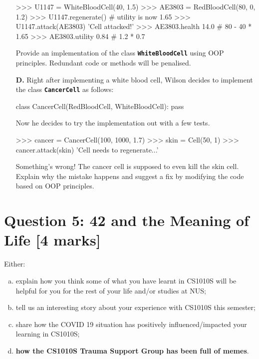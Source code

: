 \begin{enumerate}
\begin{python}
>>> U1147 = WhiteBloodCell(40, 1.5)
>>> AE3803 = RedBloodCell(80, 0, 1.2)
>>> U1147.regenerate()      # utility is now 1.65
>>> U1147.attack(AE3803)
'Cell attacked!'
>>> AE3803.health
14.0                        # 80 - 40 * 1.65
>>> AE3803.utility
0.84                        # 1.2 * 0.7
\end{python}
Provide an implementation of the class \colorbox{CornflowerBlue!20}{\texttt{\textbf{WhiteBloodCell}}} using OOP principles. Redundant code or methods will be 
penalised.
\begin{flushright}
    [6 marks]
\end{flushright}

\item[\textbf{D.}]
Right after implementing a white blood cell, Wilson decides to implement the class \colorbox{CornflowerBlue!20}{\texttt{\textbf{CancerCell}}} as follows:
\begin{python}
class CancerCell(RedBloodCell, WhiteBloodCell):
    pass
\end{python}
Now he decides to try the implementation out with a few tests.
\begin{python}
>>> cancer = CancerCell(100, 1000, 1.7)
>>> skin = Cell(50, 1)
>>> cancer.attack(skin)
'Cell needs to regenerate...'
\end{python}
Something's wrong! The cancer cell is supposed to even kill the skin cell. Explain why the mistake happens 
and suggest a fix by modifying the code based on OOP principles.
\begin{flushright}
    [5 marks]
\end{flushright}
\end{enumerate}

\section{Question 5: 42 and the Meaning of Life [4 marks]}
Either:
\begin{enumerate}[(a)]
    \item explain how you think some of what you have learnt in CS1010S will be helpful for
    you for the rest of your life and/or studies at NUS;
    \item tell us an interesting story about your
    experience with CS1010S this semester;
    \item share how the COVID 19 situation has positively
    influenced/impacted your learning in CS1010S;
    \item \textbf{how the CS1010S Trauma Support Group has been full of memes}.
\end{enumerate}
